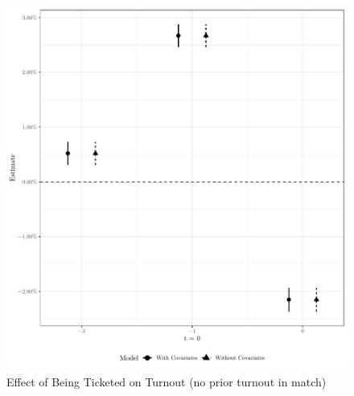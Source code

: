 \documentclass[
  12pt,
]{article}
\begin{document}
\begin{figure}[H]

{\centering \includegraphics{compile_files/figure-latex/event-study-no-prior-1} 

}

\caption{\label{fig:did-1}Effect of Being Ticketed on Turnout (no prior turnout in match)}\label{fig:event-study-no-prior}
\end{figure}
\end{document}
